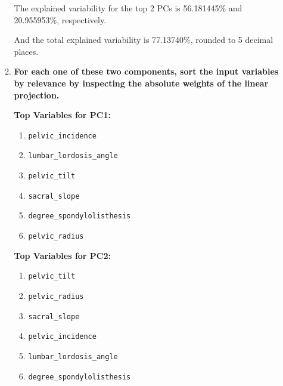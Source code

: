 \documentclass[12pt]{article}
\begin{document}
\begin{enumerate}[leftmargin=\labelsep]
\begin{enumerate}
                The explained variability for the top 2 PCs is 56.181445\% and 20.955953\%, respectively.

                And the total explained variability is 77.13740\%, rounded to 5 decimal places.

          \item \textbf{For each one of these two components, sort the input variables by relevance by
                  inspecting the absolute weights of the linear projection.}

                \vskip 0.3cm
                


                \begin{minipage}[t]{0.45\linewidth}
                  \textbf{Top Variables for PC1:}
                  \begin{enumerate}[label=\arabic*.]
                    \item \texttt{pelvic\_incidence}
                    \item \texttt{lumbar\_lordosis\_angle}
                    \item \texttt{pelvic\_tilt}
                    \item \texttt{sacral\_slope}
                    \item \texttt{degree\_spondylolisthesis}
                    \item \texttt{pelvic\_radius}
                  \end{enumerate}
                \end{minipage}
                \hfill
                \begin{minipage}[t]{0.45\linewidth}
                  \textbf{Top Variables for PC2:}
                  \begin{enumerate}[label=\arabic*.]
                    \item \texttt{pelvic\_tilt}
                    \item \texttt{pelvic\_radius}
                    \item \texttt{sacral\_slope}
                    \item \texttt{pelvic\_incidence}
                    \item \texttt{lumbar\_lordosis\_angle}
                    \item \texttt{degree\_spondylolisthesis}
                  \end{enumerate}
                \end{minipage}



\end{enumerate}
\end{enumerate}
\end{document}
